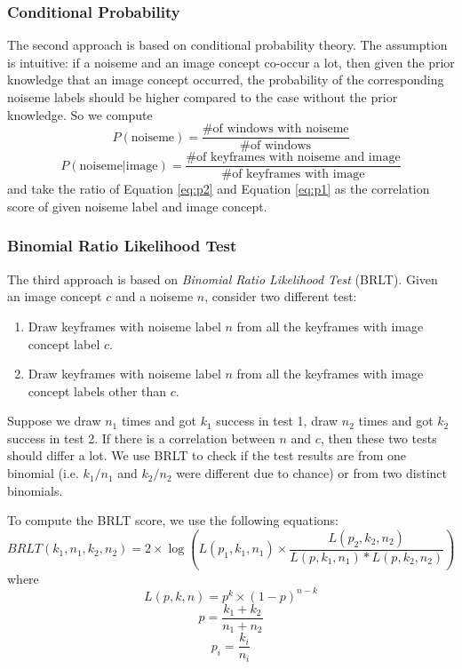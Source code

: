 \documentclass[conference, 11pt, onecolumn]{IEEEtran}
\begin{document}
\subsubsection{Conditional Probability}
The second approach is based on conditional probability theory. The assumption is intuitive: if a noiseme and an image concept co-occur a lot, then given the prior knowledge that an image concept occurred, the probability of the corresponding noiseme labels should be higher compared to the case without the prior knowledge. So we compute
\begin{equation}
\label{eq:p1}
P(\mbox{noiseme}) = \frac{\mbox{\# of windows with noiseme}}{\mbox{\# of windows}}
\end{equation}
\begin{equation}
\label{eq:p2}
P(\mbox{noiseme} | \mbox{image}) = \frac{\mbox{\# of keyframes with noiseme and image}}{\mbox{\# of keyframes with image}}
\end{equation}
and take the ratio of Equation \ref{eq:p2} and Equation \ref{eq:p1} as the correlation score of given noiseme label and image concept.

\subsubsection{Binomial Ratio Likelihood Test}
The third approach is based on \emph{Binomial Ratio Likelihood Test} (BRLT). Given an image concept $c$ and a noiseme $n$, consider two different test:

\begin{enumerate}
\item Draw keyframes with noiseme label $n$ from all the keyframes with image concept label $c$.
\item Draw keyframes with noiseme label $n$ from all the keyframes with image concept labels other than $c$.
\end{enumerate}

Suppose we draw $n_1$ times and got $k_1$ success in test 1, draw $n_2$ times and got $k_2$ success in test 2. If there is a correlation between $n$ and $c$, then these two tests should differ a lot. We use BRLT to check if the test results are from one binomial (i.e. $k_1/n_1$ and $k_2/n_2$ were different due to chance) or from two distinct binomials.

To compute the BRLT score, we use the following equations:
\begin{equation}
\label{eq:brlt1}
BRLT(k_1, n_1, k_2, n_2) = 2 \times \log \left( L(p_1, k_1, n_1) \times  \frac{L(p_2, k_2, n_2)}{L(p, k_1, n_1) * L(p, k_2, n_2)} \right)
\end{equation}
where
\begin{equation}
\label{eq:brlt2}
L(p, k, n) = p^k \times (1 - p)^{n - k}
\end{equation}
\begin{equation}
\label{eq:brlt3}
p = \frac{k_1 + k_2}{n_1 + n_2}
\end{equation}
\begin{equation}
\label{eq:brlt4}
p_i = \frac{k_i}{n_i}
\end{equation}
\end{document}
